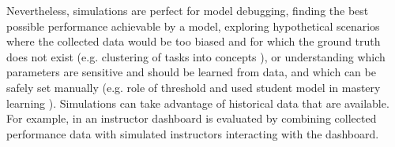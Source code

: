 Nevertheless, simulations are perfect for model debugging,
finding the best possible performance achievable by a model,
exploring hypothetical scenarios where the collected data would be too biased
and for which the ground truth does not exist
(e.g. clustering of tasks into concepts \cite[section\,3.3]{rihak-phd}),
or understanding which parameters are sensitive and should be learned from data,
and which can be safely set manually
(e.g. role of threshold and used student model in mastery learning
\cite{alg.mastery}). %
Simulations can take advantage of historical data that are available.
For example, in \cite{instructor-dashboard-realtime} an instructor dashboard is
evaluated by combining collected performance data %
with simulated instructors interacting with the dashboard.



%
%
%
